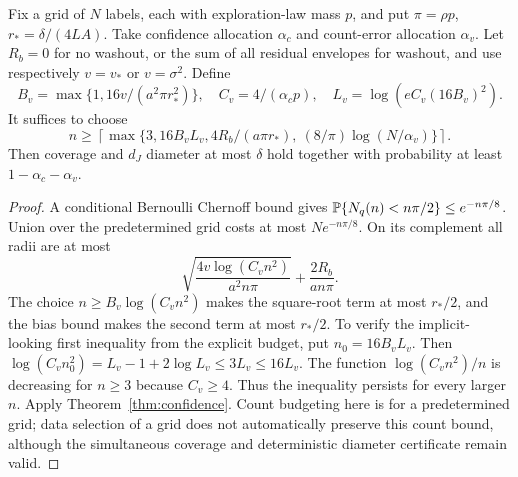\begin{proposition}
\label{prop:visits}
Fix a grid of $N$ labels, each with exploration-law mass $p$, and put
$\pi=\rho p$, $r_*=\delta/(4LA)$. Take confidence allocation
$\alpha_c$ and count-error allocation $\alpha_v$. Let $R_b=0$ for no washout,
or the sum of all residual envelopes for washout, and use respectively
$v=v_*$ or $v=\sigma^2$. Define
\[
 B_v=\max\{1,16v/(a^2\pi r_*^2)\},\quad C_v=4/(\alpha_c p),\quad
 L_v=\log(eC_v(16B_v)^2).
\]
It suffices to choose
\begin{equation}
 n\ge\left\lceil\max\{3,16B_vL_v,
             4R_b/(a\pi r_*),\ (8/\pi)\log(N/\alpha_v)\}\right\rceil.
 \label{eq:visit-budget}
\end{equation}
Then coverage and $d_J$ diameter at most $\delta$ hold together with
probability at least $1-\alpha_c-\alpha_v$.
\end{proposition}
\begin{proof}
A conditional Bernoulli Chernoff bound gives
$\mathbb P\{N_q(n)<n\pi/2\}\le e^{-n\pi/8}$. Union over the predetermined grid
costs at most $Ne^{-n\pi/8}$. On its complement all radii are at most
\[
 \sqrt{\frac{4v\log(C_vn^2)}{a^2n\pi}}+\frac{2R_b}{an\pi}.
\]
The choice $n\ge B_v\log(C_vn^2)$ makes the square-root term at most $r_*/2$,
and the bias bound makes the second term at most $r_*/2$.
To verify the implicit-looking first inequality from the explicit budget,
put $n_0=16B_vL_v$. Then
$\log(C_v n_0^2)=L_v-1+2\log L_v\le3L_v\le16L_v$.
The function $\log(C_vn^2)/n$ is decreasing for $n\ge3$ because $C_v\ge4$.
Thus the inequality persists for every larger $n$. Apply
Theorem~\ref{thm:confidence}. Count budgeting here is for a predetermined grid;
data selection of a grid does not automatically preserve this count bound,
although the simultaneous coverage and deterministic diameter certificate
remain valid.
\end{proof}

